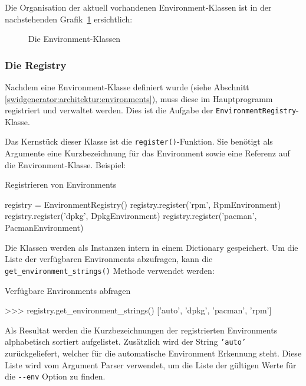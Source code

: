 Die Organisation der aktuell vorhandenen Environment-Klassen ist in der nachstehenden Grafik~\ref{img:environment-klassendiagramm} ersichtlich:

\begin{figure}[H]
	\centering
	\resizebox{\textwidth}{!}{%
		
	}
	\caption{Die Environment-Klassen}
	\label{img:environment-klassendiagramm}
\end{figure}


\subsubsection{Die Registry}
\label{swidgenerator:architektur:environments:registry}

Nachdem eine Environment-Klasse definiert wurde (siehe Abschnitt
\ref{swidgenerator:architektur:environments}), muss diese im Hauptprogramm
registriert und verwaltet werden. Dies ist die Aufgabe der
\texttt{EnvironmentRegistry}-Klasse.

Das Kernstück dieser Klasse ist die \texttt{register()}-Funktion. Sie benötigt als
Argumente eine Kurzbezeichnung für das Environment sowie eine Referenz auf die
Environment-Klasse. Beispiel:
\begin{listing}[H]
\caption{Registrieren von Environments}
\begin{pythoncode}
registry = EnvironmentRegistry()
registry.register('rpm', RpmEnvironment)
registry.register('dpkg', DpkgEnvironment)
registry.register('pacman', PacmanEnvironment)
\end{pythoncode}
\end{listing}

Die Klassen werden als Instanzen intern in einem Dictionary gespeichert. Um die
Liste der verfügbaren Environments abzufragen, kann die
\texttt{get\_environment\_strings()} Methode verwendet werden:

\begin{listing}[H]
\caption{Verfügbare Environments abfragen}
\begin{pythoncode}
>>> registry.get_environment_strings()
['auto', 'dpkg', 'pacman', 'rpm']
\end{pythoncode}
\end{listing}

Als Resultat werden die Kurzbezeichnungen der registrierten Environments
alphabetisch sortiert aufgelistet. Zusätzlich wird der String \texttt{'auto'}
zurückgeliefert, welcher für die automatische Environment Erkennung steht. Diese
Liste wird vom Argument Parser verwendet, um die Liste der gültigen Werte für die
\texttt{-{}-env} Option zu finden.

